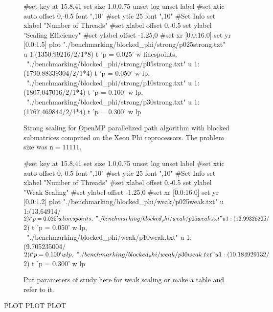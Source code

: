\documentclass[11pt]{article}
\begin{document}
\begin{figure}[h]
	\begin{center}
		\begin{gnuplot}[terminal=cairolatex, terminaloptions= color] 
			#set key at 15.8,41
			set size 1.0,0.75              
			unset log                          
			unset label                          
			#set xtic auto offset 0,-0.5 font ",10"                     
			#set ytic 25 font ",10" 
			#Set Info
			set xlabel "Number of Threads"
			#set xlabel offset 0,-0.5
			set ylabel "Scaling Efficiency"
			#set ylabel offset -1.25,0
			#set xr [0.0:16.0]
			set yr [0.0:1.5]
			plot "./benchmarking/blocked_phi/strong/p025strong.txt" u 1:(1350.99216/$2/$1*8) t 'p = 0.025' w linespoints, \
			"./benchmarking/blocked_phi/strong/p05strong.txt" u 1:(1790.88339304/$2/$1*4) t 'p = 0.050' w lp, \
			"./benchmarking/blocked_phi/strong/p10strong.txt" u 1:(1807.047016/$2/$1*4) t 'p = 0.100' w lp, \
			"./benchmarking/blocked_phi/strong/p30strong.txt" u 1:(1767.469844/$2/$1*4) t 'p = 0.300' w lp
		\end{gnuplot}
		\caption{Strong scaling for OpenMP parallelized path algorithm with blocked submatrices computed on the Xeon Phi coprocessors. The problem size was $\mathtt{n} = 11111$.}
		\label{blocked_device_ss}
	\end{center}
\end{figure}


\begin{figure}[h]
	\begin{center}
		\begin{gnuplot}[terminal=cairolatex, terminaloptions= color] 
			#set key at 15.8,41
			set size 1.0,0.75              
			unset log                          
			unset label                          
			#set xtic auto offset 0,-0.5 font ",10"                     
			#set ytic 25 font ",10" 
			#Set Info
			set xlabel "Number of Threads"
			#set xlabel offset 0,-0.5
			set ylabel "Weak Scaling"
			#set ylabel offset -1.25,0
			#set xr [0.0:16.0]
			set yr [0.0:1.2]
			plot "./benchmarking/blocked_phi/weak/p025weak.txt" u 1:(13.64914/$2) t 'p = 0.025' w linespoints, \
			"./benchmarking/blocked_phi/weak/p05weak.txt" u 1:(13.99326205/$2) t 'p = 0.050' w lp, \
			"./benchmarking/blocked_phi/weak/p10weak.txt" u 1:(9.705235004/$2) t 'p = 0.100' w lp, \
			"./benchmarking/blocked_phi/weak/p30weak.txt" u 1:(10.184929132/$2) t 'p = 0.300' w lp
		\end{gnuplot}
		\caption{\Huge Put parameters of study here for weak scaling or make a table and refer to it.}
		\label{blocked_device_ws}
	\end{center}
\end{figure}
\begin{center}
	{\Huge PLOT PLOT PLOT}
\end{center}
\end{document}
